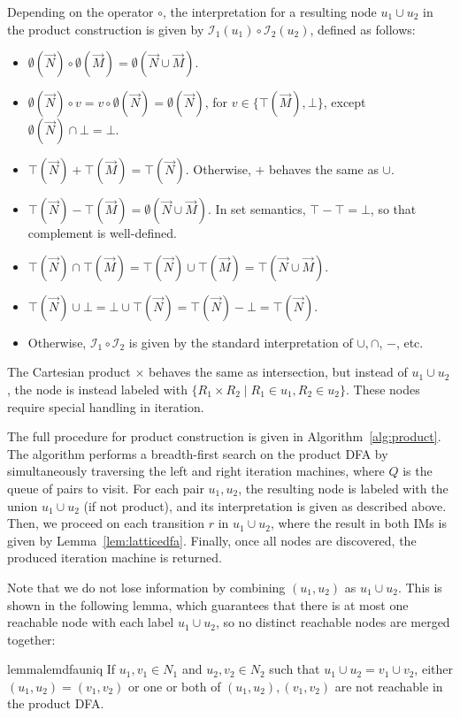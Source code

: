 \documentclass[acmsmall,screen,nonacm]{acmart}\settopmatter{printfolios=true,printccs=false,printacmref=false}
\newcommand*{\interp}{\mathcal{I}}
\begin{document}
Depending on the operator $\circ$, the interpretation for a resulting node $u_1 \cup u_2$ in the product construction
is given by $\interp_1(u_1) \circ \interp_2(u_2)$, defined as follows:
\begin{itemize}
    \item $\emptyset(\vec{N}) \circ \emptyset(\vec{M}) = \emptyset(\vec{N} \cup \vec{M})$.
    \item $\emptyset(\vec{N}) \circ v = v \circ \emptyset(\vec{N}) = \emptyset(\vec{N})$,
        for $v \in \{\top(\vec{M}), \bot\}$, except $\emptyset(\vec{N}) \cap \bot = \bot$.
    \item$\top(\vec{N}) + \top(\vec{M}) = \top(\vec{N})$. Otherwise, $+$ behaves the same as $\cup$.
    \item $\top(\vec{N}) - \top(\vec{M}) = \emptyset(\vec{N} \cup \vec{M})$. In set semantics,
        $\top - \top = \bot$, so that complement is well-defined.
    \item$\top(\vec{N}) \cap \top(\vec{M}) = \top(\vec{N}) \cup \top(\vec{M}) = \top(\vec{N} \cup \vec{M})$.
    \item $\top(\vec{N}) \cup \bot = \bot \cup \top(\vec{N}) = \top(\vec{N}) - \bot = \top(\vec{N})$.
    \item Otherwise, $\interp_1 \circ \interp_2$ is given by the standard interpretation of
        $\cup, \cap$, $-$, etc.
\end{itemize}
The Cartesian product $\times$ behaves the same as intersection, but instead of $u_1 \cup u_2$, the node is instead labeled with $\{ R_1 \times R_2 \mid R_1 \in u_1, R_2 \in u_2 \}.$ These nodes require special handling in iteration.

The full procedure for product construction is given in Algorithm~\ref{alg:product}.
The algorithm performs a breadth-first search on the product DFA by simultaneously traversing the left and right iteration machines,
where $Q$ is the queue of pairs to visit. For each pair $u_1, u_2$, the resulting node is labeled with the union $u_1 \cup u_2$ (if not product), and its interpretation is given as described above. Then, we proceed on each transition $r$ in $u_1 \cup u_2$, where the result in both IMs is given by Lemma~\ref{lem:latticedfa}. Finally, once all nodes are discovered, the produced iteration machine is returned.

Note that we do not lose information by combining $(u_1, u_2)$ as $u_1 \cup u_2$.
This is shown in the following lemma, which guarantees that there is at most one reachable node
with each label $u_1 \cup u_2$, so no distinct reachable nodes are merged together:
\begin{restatable}{lemma}{lemdfauniq}\label{lem:dfauniq}
    If $u_1, v_1 \in N_1$ and $u_2, v_2 \in N_2$ such that
    $u_1 \cup u_2 = v_1 \cup v_2$, either $(u_1, u_2) = (v_1, v_2)$
    or one or both of $(u_1, u_2), (v_1, v_2)$ are not reachable
    in the product DFA.
\end{restatable}
\end{document}

